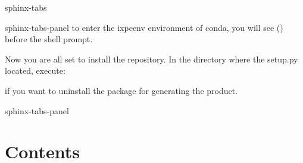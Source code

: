\documentclass[letterpaper,10pt,english]{sphinxmanual}
\begin{document}
\begin{sphinxuseclass}{sphinx-tabs}
\begin{sphinxuseclass}{sphinx-tabs-panel}
\sphinxAtStartPar
to enter the ixpe\sphinxhyphen{}env environment of conda, you will see () before the shell prompt.

\sphinxAtStartPar
Now you are all set to install the repository. In the directory where the setup.py located, execute:

\begin{sphinxVerbatim}[commandchars=\\\{\}]
\end{sphinxVerbatim}

\sphinxAtStartPar
if you want to uninstall the package for generating the product.

\begin{sphinxVerbatim}[commandchars=\\\{\}]
\end{sphinxVerbatim}

\end{sphinxuseclass}
\begin{sphinxuseclass}{sphinx-tabs-panel}
\end{sphinxuseclass}
\end{sphinxuseclass}

\chapter{Contents}
\label{\detokenize{index:contents}}
\end{document}
